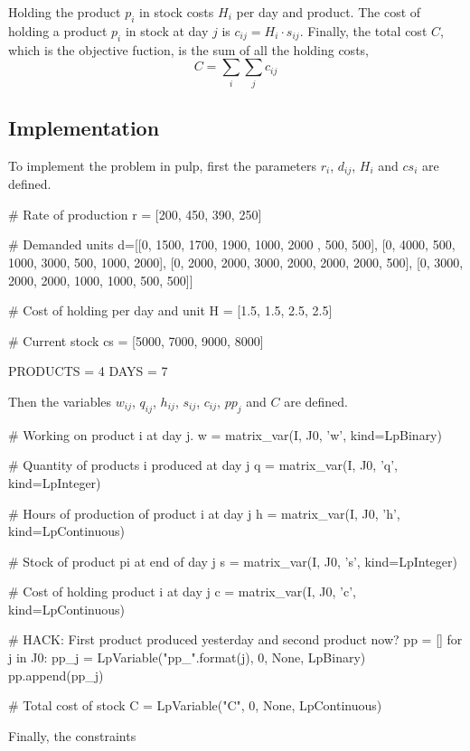 \documentclass[11pt,a4paper]{article}
\begin{document}
Holding the product $p_i$ in stock costs $H_i$ per day and product. The cost of 
holding a product $p_i$ in stock at day $j$ is $c_{ij} = H_i \cdot s_{ij}$.
%
Finally, the total cost $C$, which is the objective fuction, is the sum of all 
the holding costs,
$$ C= \sum_i \sum_j c_{ij} $$
%

\subsection*{Implementation}

To implement the problem in pulp, first the parameters $r_i$, $d_{ij}$, $H_i$ 
and $cs_i$ are defined.
%
\begin{pycode}
# Rate of production
r = [200, 450, 390, 250]

# Demanded units
d=[[0, 1500, 1700, 1900, 1000, 2000 , 500,  500],
	 [0, 4000,  500, 1000, 3000,  500, 1000, 2000],
	 [0, 2000, 2000, 3000, 2000, 2000, 2000,  500],
	 [0, 3000, 2000, 2000, 1000, 1000,  500,  500]]

# Cost of holding per day and unit
H = [1.5, 1.5, 2.5, 2.5]

# Current stock
cs = [5000, 7000, 9000, 8000]

PRODUCTS = 4
DAYS = 7
\end{pycode}
%
Then the variables $w_{ij}$, $q_{ij}$, $h_{ij}$, $s_{ij}$, $c_{ij}$, $pp_j$ and 
$C$ are defined.
%
\begin{pycode}
# Working on product i at day j.
w = matrix_var(I, J0, 'w', kind=LpBinary)

# Quantity of products i produced at day j
q = matrix_var(I, J0, 'q', kind=LpInteger)

# Hours of production of product i at day j
h = matrix_var(I, J0, 'h', kind=LpContinuous)

# Stock of product pi at end of day j
s = matrix_var(I, J0, 's', kind=LpInteger)

# Cost of holding product i at day j
c = matrix_var(I, J0, 'c', kind=LpContinuous)

# HACK: First product produced yesterday and second product now?
pp = []
for j in J0:
	pp_j = LpVariable("pp_{}".format(j), 0, None, LpBinary)
	pp.append(pp_j)

# Total cost of stock
C = LpVariable("C", 0, None, LpContinuous)
\end{pycode}
%
Finally, the constraints
%
\end{document}
